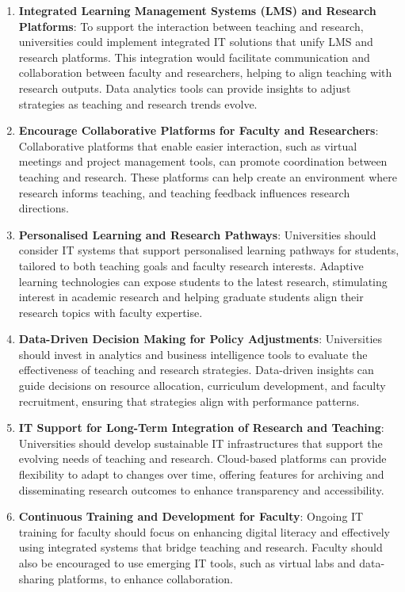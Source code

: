 \documentclass[conference]{IEEEtran}
\begin{document}
\begin{enumerate}
	\item \textbf{Integrated Learning Management Systems (LMS) and Research Platforms}: To support the interaction between teaching and research, universities could implement integrated IT solutions that unify LMS and research platforms. This integration would facilitate communication and collaboration between faculty and researchers, helping to align teaching with research outputs. Data analytics tools can provide insights to adjust strategies as teaching and research trends evolve.
	
	\item \textbf{Encourage Collaborative Platforms for Faculty and Researchers}: Collaborative platforms that enable easier interaction, such as virtual meetings and project management tools, can promote coordination between teaching and research. These platforms can help create an environment where research informs teaching, and teaching feedback influences research directions.
	
	\item \textbf{Personalised Learning and Research Pathways}: Universities should consider IT systems that support personalised learning pathways for students, tailored to both teaching goals and faculty research interests. Adaptive learning technologies can expose students to the latest research, stimulating interest in academic research and helping graduate students align their research topics with faculty expertise.
	
	\item \textbf{Data-Driven Decision Making for Policy Adjustments}: Universities should invest in analytics and business intelligence tools to evaluate the effectiveness of teaching and research strategies. Data-driven insights can guide decisions on resource allocation, curriculum development, and faculty recruitment, ensuring that strategies align with performance patterns.
	
	\item \textbf{IT Support for Long-Term Integration of Research and Teaching}: Universities should develop sustainable IT infrastructures that support the evolving needs of teaching and research. Cloud-based platforms can provide flexibility to adapt to changes over time, offering features for archiving and disseminating research outcomes to enhance transparency and accessibility.
	
	\item \textbf{Continuous Training and Development for Faculty}: Ongoing IT training for faculty should focus on enhancing digital literacy and effectively using integrated systems that bridge teaching and research. Faculty should also be encouraged to use emerging IT tools, such as virtual labs and data-sharing platforms, to enhance collaboration.
	

\end{enumerate}
\end{document}
